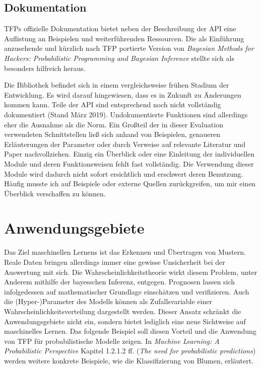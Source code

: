 \documentclass[12pt]{article}
\begin{document}
\subsection{Dokumentation}
TFPs offizielle Dokumentation bietet neben der Beschreibung der API eine Auflistung an Beispielen und weiterführenden Ressourcen. Die als Einführung anzusehende und kürzlich nach TFP portierte Version von \textit{Bayesian Methods for Hackers: Probabilistic Programming and Bayesian Inference}\cite{Davidson-Pilon2015} stellte sich als besonders hilfreich heraus.

Die Bibliothek befindet sich in einem vergleichsweise frühen Stadium der Entwicklung. Es wird darauf hingewiesen, dass es in Zukunft zu Änderungen kommen kann. Teile der API sind entsprechend noch nicht vollständig dokumentiert (Stand März 2019).
Undokumentierte Funktionen sind allerdings eher die Ausnahme als die Norm. Ein Großteil der in dieser Evaluation verwendeten Schnittstellen ließ sich anhand von Beispielen, genaueren Erläuterungen der Parameter oder durch Verweise auf relevante Literatur und Paper nachvollziehen. Einzig ein Überblick oder eine Einleitung der individuellen Module und deren Funktionsweisen fehlt fast vollständig. Die Verwendung dieser Module wird dadurch nicht sofort ersichtlich und erschwert deren Benutzung. Häufig musste ich auf Beispiele oder externe Quellen zurückgreifen, um mir einen Überblick verschaffen zu können.

\section{Anwendungsgebiete}

Das Ziel maschinellen Lernens ist das Erkennen und Übertragen von Mustern. Reale Daten bringen allerdings immer eine gewisse Unsicherheit bei der Auswertung mit sich. Die Wahrscheinlichkeitstheorie wirkt diesem Problem, unter Anderem mithilfe der bayesschen Inferenz, entgegen. Prognosen lassen sich infolgedessen auf mathematischer Grundlage einschätzen und verifizieren. Auch die (Hyper-)Parameter des Modells können als Zufallsvariable einer Wahrscheinlichkeitsverteilung dargestellt werden. Dieser Ansatz schränkt die Anwendungsgebiete nicht ein, sondern bietet lediglich eine neue Sichtweise auf maschinelles Lernen. Das folgende Beispiel soll diesen Vorteil und die Anwendung von TFP für probabilistische Modelle zeigen. In \textit{Machine Learning: A Probabilistic Perspective}\cite{Murphy2012} Kapitel 1.2.1.2 ff. (\textit{The need for probabilistic predictions}) werden weitere konkrete Beispiele, wie die Klassifizierung von Blumen, erläutert. 
\end{document}
